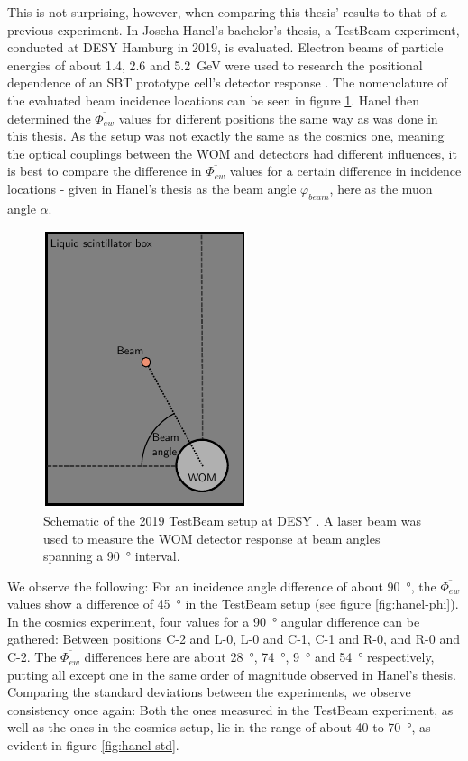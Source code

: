     This is not surprising, however, when comparing this thesis' results to that of a previous experiment. In Joscha Hanel's bachelor's thesis, a TestBeam experiment, conducted at \ac{DESY} Hamburg in 2019, is evaluated. Electron beams of particle energies of about 1.4, 2.6 and \SI{5.2}{\giga\electronvolt} were used to research the positional dependence of an \ac{SBT} prototype cell's detector response \cite{HANEL}. The nomenclature of the evaluated beam incidence locations can be seen in figure \ref{fig:testbeam-setup}. Hanel then determined the $\overline{\Phi_{ew}}$ values for different positions the same way as was done in this thesis. As the setup was not exactly the same as the cosmics one, meaning the optical couplings between the \ac{WOM} and detectors had different influences, it is best to compare the difference in $\overline{\Phi_{ew}}$ values for a certain difference in incidence locations - given in Hanel's thesis as the beam angle $\varphi_{beam}$, here as the muon angle $\alpha$. 
    
    \begin{figure}
    	\centering
    	\includegraphics[width=.5\textwidth]{pictures/testbeam.pdf}
    	\caption{Schematic of the 2019 TestBeam setup at \ac{DESY} \cite{HANEL}. A laser beam was used to measure the \ac{WOM} detector response at beam angles spanning a \SI{90}{\degree} interval.}
    	\label{fig:testbeam-setup}
    \end{figure}
    
    We observe the following: For an incidence angle difference of about \SI{90}{\degree}, the $\overline{\Phi_{ew}}$ values show a difference of \SI{45}{\degree} in the TestBeam setup (see figure \ref{fig:hanel-phi}). In the cosmics experiment, four values for a \SI{90}{\degree} angular difference can be gathered: Between positions C-2 and L-0, L-0 and C-1, C-1 and R-0, and R-0 and C-2. The $\overline{\Phi_{ew}}$ differences here are about \SI{28}{\degree}, \SI{74}{\degree}, \SI{9}{\degree} and \SI{54}{\degree} respectively, putting all except one in the same order of magnitude observed in Hanel's thesis.
    Comparing the standard deviations between the experiments, we observe consistency once again: Both the ones measured in the TestBeam experiment, as well as the ones in the cosmics setup, lie in the range of about 40 to \SI{70}{\degree}, as evident in figure \ref{fig:hanel-std}.
    
